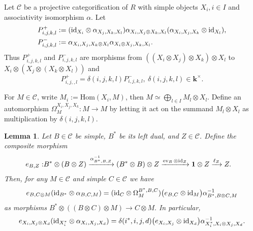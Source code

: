 \documentclass[12pt]{amsart}
\numberwithin{equation}{section}
\newtheorem{lemma}[theorem]{Lemma}
\theoremstyle{definition}
\newcommand{\Hom}{\text{Hom}}
\newcommand{\1}{_{(1)}}
\newcommand{\2}{_{(2)}}
\newcommand{\3}{_{(3)}}
\newcommand{\4}{_{(4)}}
\newcommand{\5}{_{(5)}}
\newcommand{\6}{_{(6)}}
\newcommand{\C}{\mathcal{C}}
\theoremstyle{plain}
\theoremstyle{definition}
\theoremstyle{remark}
\def\C{\mathcal{C}}
\def\Hom{\mathrm{Hom}}
\def\k{\mathbf{k}}
\begin{document}
Let $\C$ be a projective categorification of $R$ with simple objects 
$X_i,i\in I$ and associativity isomorphism $\alpha$. Let 
\begin{equation*}
\begin{aligned}
P^+_{i,j,k,l}
&:=({\rm id}_{X_i}\otimes \alpha_{X_j,X_k,X_l})
   \alpha_{X_i,X_j\otimes X_k,X_l}
   (\alpha_{X_i,X_j,X_k}\otimes{\rm id}_{X_l}),\\
P^-_{i,j,k,l}
&:=\alpha_{X_i,X_j,X_k\otimes X_l}\alpha_{X_i\otimes X_j,X_k,X_l}.
\end{aligned}
\end{equation*}
Thus \(P^+_{i,j,k,l}\) and \(P^-_{i,j,k,l}\) are morphisms from
\(((X_i\otimes X_j)\otimes X_k)\otimes X_l\) to
\(X_i\otimes(X_j\otimes(X_k\otimes X_l))\) and
\begin{equation}
\label{eq:projective-pentagon-convention}
        P^+_{i,j,,l}=\delta(i,j,k,l)P^-_{i,j,k,l},\
         \delta(i,j,k,l)\in \k^\times .
\end{equation}

For \(M\in \C\), write $M_i:=\Hom(X_i,M)$,
 then $M\simeq \bigoplus_{l\in I} M_l\otimes X_l$. 
Define an automorphism $\Omega^{X_i,X_j,X_k}_M: M\longrightarrow M$
by letting it act on the summand \(M_l\otimes X_l\) as multiplication by
\(\delta(i,j,k,l)\).  

\begin{lemma}
\label{lem:projective-sliding}
Let \(B\in \C\) be simple, \(B^*\) be its left dual, and $Z\in \C$. Define the composite morphism
\begin{equation*}
\begin{aligned}
        e_{B,Z}:&
        B^*\otimes(B\otimes Z)
        \xrightarrow{\alpha^{-1}_{B^*,B,Z}}
        (B^*\otimes B)\otimes Z
        \xrightarrow{\operatorname{ev}_B\otimes{\rm id}_Z}
        {\bf 1}\otimes Z
        \xrightarrow{\ell_Z}
        Z .
\end{aligned}
\end{equation*}
Then, for any $M\in \C$ and simple $C\in \C$ we have 
\begin{equation}
\label{eq:sliding-left}e_{B,C\otimes M}
  ({\rm id}_{B^*}\otimes\alpha_{B,C,M})=
({\rm id}_C\otimes\Omega^{B^*,B,C}_M)
\bigl(e_{B,C}\otimes{\rm id}_M\bigr)
\alpha^{-1}_{B^*,B\otimes C,M}
\end{equation}
as morphisms
$B^*\otimes((B\otimes C)\otimes M)\longrightarrow C\otimes M.$
In particular, 
\begin{equation}
\label{eq:sliding-left1}
e_{X_i,X_j\otimes X_d}
  ({\rm id}_{X_i^*}\otimes\alpha_{X_i,X_j,X_d})=
\delta(i^*,i,j,d)
\bigl(e_{X_i,X_j}\otimes{\rm id}_{X_d}\bigr)
\alpha^{-1}_{X_i^*,X_i\otimes X_j,X_d}.
\end{equation}
\end{lemma}
\end{document}
